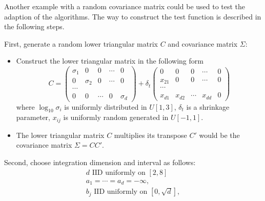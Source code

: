 \documentclass{iitthesis}
\begin{document}
Another example with a random covariance matrix could be used to test the adaption of the algorithms. The way to construct the test function is described in the following steps. 

First, generate a random lower triangular matrix $C$ and covariance matrix $\Sigma$:
\begin{itemize}
\item Construct the lower triangular matrix in the following form
\begin{equation}\label{lowertrimatrixC}
C = \left (\begin{array}{ccccc}
\sigma_1&0&0&\cdots&0\\
0&\sigma_2&0& \cdots &0 \\
\cdots\\
0&0&\cdots&0&\sigma_d \end{array}\right)+\delta_t  \left (\begin{array}{ccccc}
0&0&0&\cdots&0\\
x_{21}&0&0& \cdots &0 \\
\cdots\\
x_{d1}&x_{d2}&\cdots&x_{dd}&0 \end{array}\right)
\end{equation}
where $\log_{10}\sigma_i$ is uniformly distributed in $U[1,3]$, $\delta_t$ is a shrinkage parameter, $x_{ij}$ is uniformly random generated in $U[-1,1]$.
\item The lower triangular matrix $C$ multiplies its transpose $C'$ would be the covariance matrix $\Sigma = CC'$.
\end{itemize}
Second, choose integration dimension and interval as follows:
\begin{subequations} \label{MVNPexp2param}
\begin{gather}
d \text{ IID uniformly on } [2,8] \\
a_1=\cdots=a_d =-\infty,\\
b_j \text{ IID uniformly on } [0,\sqrt{d}],\\
\end{gather}
\end{subequations}
\end{document}
